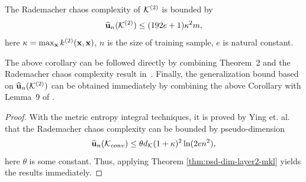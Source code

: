 \begin{corollary}
The Rademacher chaos complexity of ${\mathcal K}^{(2)}$ is bounded by
\begin{equation}
\eu(\k^{(2)}) \leq (192e + 1)\kappa^2m, \label{eqn:bnd-rdm}
\end{equation}
here $\kappa = \max_{{\bf x}}k^{(2)}({\bf x}, {\bf x})$, $n$ is the size of training sample, $e$ is
natural constant.
\end{corollary}
The above corollary can be followed directly by combining Theorem~2 and the
Rademacher chaos complexity result in~\cite[Theorem 3]{tr/rcc010}. Finally, the generalization bound based on ${\widehat{{\bf u}}_n}({\mathcal K}^{(2)})$ can be obtained immediately by combining the above Corollary with Lemma~9 of \cite{colt/YingC09}.

\begin{proof}
With the metric entropy integral techniques, it is proved by Ying et. al. that the
Rademacher chaos complexity can be bounded by pseudo-dimension
\begin{equation}
\eu(\k_{conv}) \leq \theta d_{\k}(1 + \kappa)^2\ln(2en^2), \label{eqn:eu-pseudo-dim}
\end{equation}
here $\theta$ is some constant. Thus, applying Theorem \ref{thm:psd-dim-layer2-mkl} yields the results immediately.
\end{proof}


